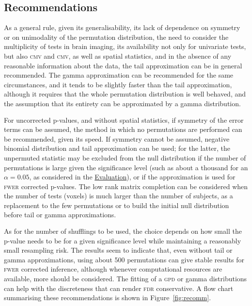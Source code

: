 \subsection{Recommendations}

As a general rule, given its generalisability, its lack of dependence on symmetry or on unimodality of the permutation distribution, the need to consider the multiplicity of tests in brain imaging, its availability not only for univariate tests, but also \textsc{cmv} and \textsc{cmv}, as well as spatial statistics, and in the absence of any reasonable information about the data, the tail approximation can be in general recommended. The gamma approximation can be recommended for the same circumstances, and it tends to be slightly faster than the tail approximation, although it requires that the whole permutation distribution is well behaved, and the assumption that its entirety can be approximated by a gamma distribution.

For uncorrected p-values, and without spatial statistics, if symmetry of the error terms can be assumed, the method in which no permutations are performed can be recommended, given its speed. If symmetry cannot be assumed, negative binomial distribution and tail approximation can be used; for the latter, the unpermuted statistic may be excluded from the null distribution if the number of permutations is large given the significance level (such as about a thousand for an $\alpha=0.05$, as considered in the \href{sec:accel:evaluation}{Evaluation}), or if the approximation is used for \textsc{fwer} corrected p-values. The low rank matrix completion can be considered when the number of tests (voxels) is much larger than the number of subjects, as a replacement to the few permutations or to build the initial null distribution before tail or gamma approximations.

As for the number of shufflings to be used, the choice depends on how small the p-value needs to be for a given significance level while maintaining a reasonably small resampling risk. The results seem to indicate that, even without tail or gamma approximations, using about 500 permutations can give stable results for \textsc{fwer} corrected inference, although whenever computational resources are available, more should be considered. The fitting of a \textsc{gpd} or gamma distributions can help with the discreteness that can render \textsc{fdr} conservative. A flow chart summarising these recommendations is shown in Figure~\ref{fig:recomm}.

